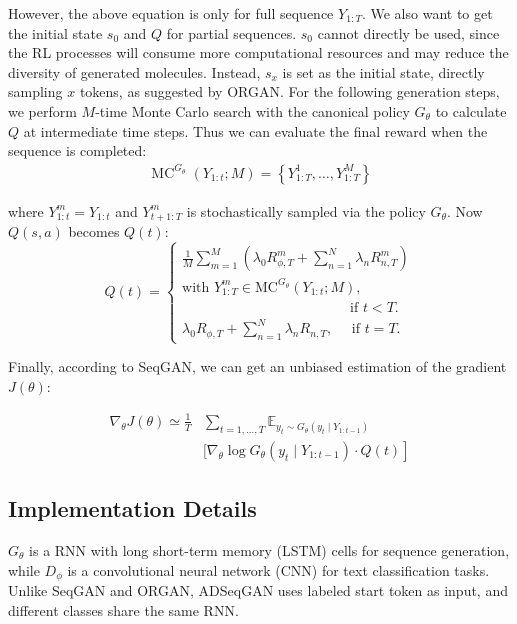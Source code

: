 \documentclass[10pt, twocolumn]{article}
\begin{document}
However, the above equation is only for full sequence $Y_{1: T}$. We also want to get the initial state $s_0$ and $Q$ for partial sequences. $s_0$ cannot directly be used, since the RL processes will consume more computational resources and may reduce the diversity of generated molecules. Instead, $s_x$ is set as the initial state, directly sampling $x$ tokens, as suggested by ORGAN. For the following generation steps, we perform $M$-time Monte Carlo search with the canonical policy $G_{\theta}$ to calculate $Q$ at intermediate time steps. Thus we can evaluate the final reward when the sequence is completed:
\begin{equation}
\begin{aligned}
\operatorname{MC}^{G_{\theta}}\left(Y_{1: t} ; M\right)=\left\{Y_{1: T}^{1}, \ldots, Y_{1: T}^{M}\right\} 
\end{aligned}
\tag{6}
\end{equation}

where $Y_{1: t}^{m}=Y_{1: t}$ and $Y_{t+1: T}^{m}$ is stochastically sampled via the policy $G_{\theta}$. Now $Q(s, a)$ becomes $Q(t)$:
\[
Q(t) = 
\begin{cases} 
\frac{1}{M} \sum_{m=1}^{M} (\lambda_0 R^m_{\phi,T}+\sum_{n=1}^N\lambda_nR^m_{n,T})  \\
\text{with } Y_{1:T}^{m} \in \mathrm{MC}^{G_{\theta}}\left(Y_{1:t}; M\right), \\
\quad\quad\quad\quad\quad\quad\quad\quad\quad\quad\quad\quad \text{if } t < T. \\ 
\lambda_0 R_{\phi,T}+\sum_{n=1}^N\lambda_nR_{n,T}, \quad \text{ if } t = T.
\end{cases}
\tag{7}
\] 

Finally, according to SeqGAN, we can get an unbiased estimation of the gradient $J(\theta)$:

\begin{equation}
\begin{aligned}
\nabla_{\theta} J(\theta) \simeq \frac{1}{T} & \sum_{t=1, \ldots, T} \mathbb{E}_{y_{t} \sim G_{\theta}\left(y_{t} \mid Y_{1: t-1}\right)} \\ &[\left.\nabla_{\theta} \log G_{\theta}\left(y_{t} \mid Y_{1: t-1}\right) \cdot Q(t)\right] 
\end{aligned}
\tag{8}
\end{equation}
\subsection{Implementation Details}
$G_{\theta}$ is a RNN with long short-term memory (LSTM) cells for sequence generation, while $D_{\phi}$ is a convolutional neural network (CNN) for text classification tasks\cite{Kim2014}. Unlike SeqGAN and ORGAN, ADSeqGAN uses labeled start token as input, and different classes share the same RNN.
\end{document}
